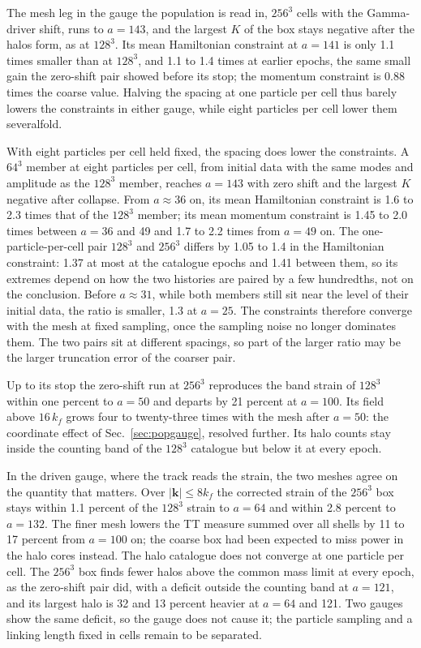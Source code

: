 \documentclass[aps,prd,twocolumn,10pt,superscriptaddress,nofootinbib,longbibliography,floatfix]{revtex4-2}
\begin{document}
The mesh leg in the gauge the population is read in, $256^3$ cells with the Gamma-driver shift, runs to $a=143$, and the largest $K$ of the box stays negative after the halos form, as at $128^3$. Its mean Hamiltonian constraint at $a=141$ is only 1.1 times smaller than at $128^3$, and 1.1 to 1.4 times at earlier epochs, the same small gain the zero-shift pair showed before its stop; the momentum constraint is 0.88 times the coarse value. Halving the spacing at one particle per cell thus barely lowers the constraints in either gauge, while eight particles per cell lower them severalfold.

With eight particles per cell held fixed, the spacing does lower the constraints. A $64^3$ member at eight particles per cell, from initial data with the same modes and amplitude as the $128^3$ member, reaches $a=143$ with zero shift and the largest $K$ negative after collapse. From $a\approx36$ on, its mean Hamiltonian constraint is 1.6 to 2.3 times that of the $128^3$ member; its mean momentum constraint is 1.45 to 2.0 times between $a=36$ and 49 and 1.7 to 2.2 times from $a=49$ on. The one-particle-per-cell pair $128^3$ and $256^3$ differs by 1.05 to 1.4 in the Hamiltonian constraint: 1.37 at most at the catalogue epochs and 1.41 between them, so its extremes depend on how the two histories are paired by a few hundredths, not on the conclusion. Before $a\approx31$, while both members still sit near the level of their initial data, the ratio is smaller, 1.3 at $a=25$. The constraints therefore converge with the mesh at fixed sampling, once the sampling noise no longer dominates them. The two pairs sit at different spacings, so part of the larger ratio may be the larger truncation error of the coarser pair.

Up to its stop the zero-shift run at $256^3$ reproduces the band strain of $128^3$ within one percent to $a=50$ and departs by 21 percent at $a=100$. Its field above $16\,k_f$ grows four to twenty-three times with the mesh after $a=50$: the coordinate effect of Sec.~\ref{sec:popgauge}, resolved further. Its halo counts stay inside the counting band of the $128^3$ catalogue but below it at every epoch.

In the driven gauge, where the track reads the strain, the two meshes agree on the quantity that matters. Over $|\mathbf k|\le 8k_f$ the corrected strain of the $256^3$ box stays within 1.1 percent of the $128^3$ strain to $a=64$ and within 2.8 percent to $a=132$. The finer mesh lowers the TT measure summed over all shells by 11 to 17 percent from $a=100$ on; the coarse box had been expected to miss power in the halo cores instead. The halo catalogue does not converge at one particle per cell. The $256^3$ box finds fewer halos above the common mass limit at every epoch, as the zero-shift pair did, with a deficit outside the counting band at $a=121$, and its largest halo is 32 and 13 percent heavier at $a=64$ and 121. Two gauges show the same deficit, so the gauge does not cause it; the particle sampling and a linking length fixed in cells remain to be separated.
\end{document}
